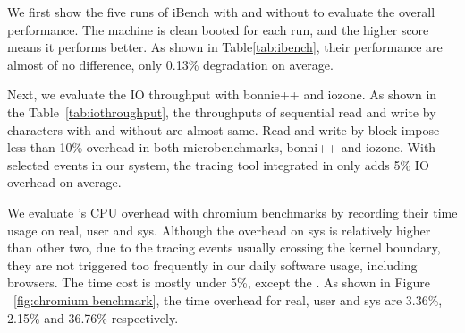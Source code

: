 
We first show the five runs of iBench with and without \xxx to evaluate the
overall performance. The machine is clean booted for each run, and the higher
score means it performs better. As shown in Table\ref{tab:ibench}, their
performance are almost of no difference, only 0.13\% degradation on average.


Next, we evaluate the IO throughput with bonnie++ and iozone. As shown in the
Table~\ref{tab:iothroughput}, the throughputs of sequential read and write
by characters with and without \xxx are almost same. Read and write by block
impose less than 10\% overhead in  both microbenchmarks, bonni++ and iozone.
With selected events in our system, the tracing tool integrated in \xxx
only adds 5\% IO overhead on average.



We evaluate \xxx's CPU overhead with chromium benchmarks by recording their
time usage on real, user and sys. Although the overhead on sys is relatively
higher than other two, due to the tracing events usually crossing the
kernel boundary, they are not triggered too frequently in our daily software
usage, including browsers. The time cost is mostly under 5\%, except the
. As shown in Figure ~\ref{fig:chromium
benchmark}, the time overhead for real, user and sys are 3.36\%, 2.15\% and 36.76\%
respectively.
